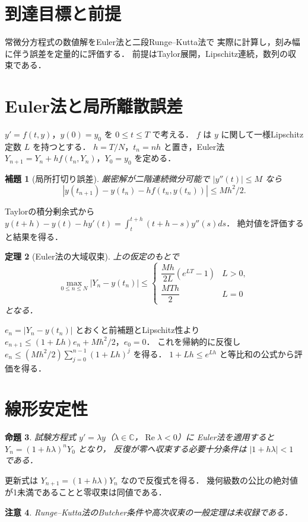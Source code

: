 \documentclass[a5paper,10pt,onecolumn]{jsarticle}
\makeatletter
\theoremstyle{mathnotetheorem}
\newtheorem{theorem}{定理}[section]
\newtheorem{lemma}[theorem]{補題}
\newtheorem{proposition}[theorem]{命題}
\newtheorem{remark}[theorem]{注意}
\renewcommand{\proofname}{証明}
\renewenvironment{proof}[1][\proofname]{%
  \par\pushQED{\qed}\normalfont\topsep4\p@\@plus2\p@\relax
  \trivlist\item[\hskip\labelsep\bfseries #1]\ignorespaces
}{\popQED\endtrivlist\@endpefalse}
\makeatother
\begin{document}
\section*{到達目標と前提}
常微分方程式の数値解をEuler法と二段Runge--Kutta法で
実際に計算し，刻み幅に伴う誤差を定量的に評価する．
前提はTaylor展開，Lipschitz連続，数列の収束である．

\section{Euler法と局所離散誤差}
$y'=f(t,y)$，$y(0)=y_0$ を $0\le t\le T$ で考える．
$f$ は $y$ に関して一様Lipschitz定数 $L$ を持つとする．
$h=T/N$，$t_n=nh$ と置き，Euler法
$Y_{n+1}=Y_n+h f(t_n,Y_n)$，$Y_0=y_0$ を定める．
\begin{lemma}[局所打切り誤差]
厳密解が二階連続微分可能で
$|y''(t)|\le M$ なら
\[
 |y(t_{n+1})-y(t_n)-h f(t_n,y(t_n))|
 \le Mh^2/2.
\]
\end{lemma}
\begin{proof}
Taylorの積分剰余式から
$y(t+h)-y(t)-hy'(t)=\int_t^{t+h}(t+h-s)y''(s)ds$．
絶対値を評価すると結果を得る．
\end{proof}
\begin{theorem}[Euler法の大域収束]
上の仮定のもとで
\[
 \max_{0\le n\le N}|Y_n-y(t_n)|
 \le\begin{cases}
 \dfrac{Mh}{2L}(e^{LT}-1)&L>0,\\
 \dfrac{MTh}{2}&L=0
 \end{cases}
\]
となる．
\end{theorem}
\begin{proof}
$e_n=|Y_n-y(t_n)|$ とおくと前補題とLipschitz性より
$e_{n+1}\le(1+Lh)e_n+Mh^2/2$，$e_0=0$．
これを帰納的に反復し
$e_n\le(Mh^2/2)\sum_{j=0}^{n-1}(1+Lh)^j$ を得る．
$1+Lh\le e^{Lh}$ と等比和の公式から評価を得る．
\end{proof}
\section{線形安定性}
\begin{proposition}
試験方程式 $y'=\lambda y$（$\lambda\in\mathbb C$，$\operatorname{Re}\lambda<0$）に
Euler法を適用すると
$Y_n=(1+h\lambda)^nY_0$ となり，
反復が零へ収束する必要十分条件は $|1+h\lambda|<1$ である．
\end{proposition}
\begin{proof}
更新式は $Y_{n+1}=(1+h\lambda)Y_n$ なので反復式を得る．
幾何級数の公比の絶対値が1未満であることと零収束は同値である．
\end{proof}
\begin{remark}
Runge--Kutta法のButcher条件や高次収束の一般定理は未収録である．
\end{remark}
\end{document}
